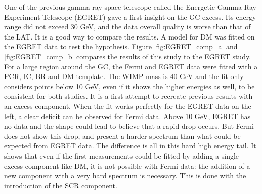 One of the previous gamma-ray space telescope called the Energetic Gamma Ray Experiment Telescope (EGRET) \cite{Bertsch1989} gave a first insight on the GC excess. Its energy range did not exceed 30 GeV, and the data overall quality is worse than that of the LAT. It is a good way to compare the results. A model for DM was fitted on the EGRET data to test the hypothesis. Figure \ref{fig:EGRET_comp_a} and \ref{fig:EGRET_comp_b} compares the results of this study to the EGRET study. For a large region around the GC, the Fermi and EGRET data were fitted with a PCR, IC, BR and DM template. The WIMP mass is 40 GeV and the fit only considers points below 10 GeV, even if it shows the higher energies as well, to be consistent for both studies. It is a first attempt to recreate previous results with an excess component.
When the fit works perfectly for the EGRET data on the left, a clear deficit can be observed for Fermi data. Above 10 GeV, EGRET has no data and the shape could lead to believe that a rapid drop occurs. But Fermi does not show this drop, and present a harder spectrum than what could be expected from EGRET data. The difference is all in this hard high energy tail. It shows that even if the first measurements could be fitted by adding a single excess component like DM, it is not possible with Fermi data: the addition of a new component with a very hard spectrum is necessary. This is done with the introduction of the SCR component.

